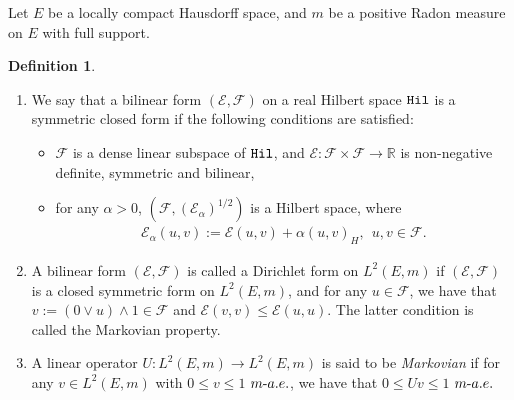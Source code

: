 \documentclass[10pt]{amsart}
\theoremstyle{definition}\newtheorem{defi}[theo]{Definition}\newtheorem{rema}[theo]{Remark}\newtheorem{exam}[theo]{Example}\newtheorem{exem}[theo]{Example}\newtheorem{nota}[theo]{Notation}
\newcommand{\ce}{\mathcal{E}}
\newcommand{\cf}{\mathcal{F}}
\newcommand{\br}{\mathbb{R}}
\begin{document}
Let $E$ be a locally compact Hausdorff space, and $m$ be a positive Radon measure on $E$ with full support.


\begin{defi}\leavevmode
\begin{enumerate}
\item\label{defi3.1.1} We say that a bilinear form $(\ce,\cf)$ on a real Hilbert space ${\tt Hil}$ is a symmetric closed form if the following conditions are satisfied:
\begin{itemize}
\item$\cf$ is a dense linear subspace of ${\tt Hil}$, and $\ce:\cf\times\cf\to\br$ is non-negative definite, symmetric and bilinear,
\item for any $\alpha>0$, $(\cf,(\ce_{\alpha})^{1/2})$ is a Hilbert space, where
\begin{align*}
\ce_{\alpha}(u,v):=\ce(u,v)+\alpha(u,v)_{H},\ \ u,v\in\cf.
\end{align*}
\end{itemize}
\item\label{defi3.1.2} A bilinear form $(\ce,\cf)$ is called a Dirichlet form on $L^2(E,m)$ if $(\ce,\cf)$ is a closed symmetric form on $L^2(E,m)$, and for any $u\in\cf$, we have that $v:=(0\vee u)\wedge1\in\cf$ and $\ce(v,v)\leq\ce(u,u)$. The latter condition is called the Markovian property.
\item\label{defi3.1.3} A linear operator $U:L^2(E,m)\to L^2(E,m)$ is said to be \emph{Markovian} if for any $v\in L^2(E,m)$ with $0\leq v\leq1$ $m\mathchar`-a.e.$, we have that $0\leq Uv\leq1$ $m\mathchar`-a.e.$
\end{enumerate}
\end{defi}
\end{document}
